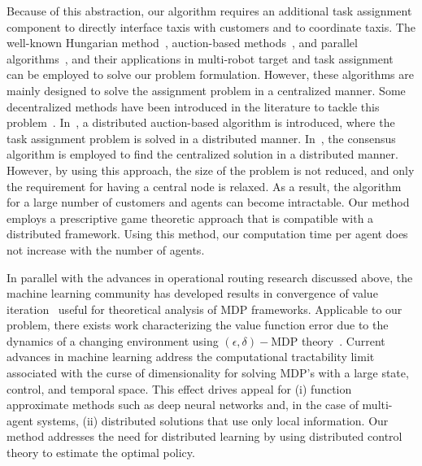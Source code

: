 \documentclass[journal]{IEEEtran}
\begin{document}
Because of this abstraction, our algorithm requires an additional task assignment component to directly interface taxis with customers and to coordinate taxis. The well-known Hungarian method~\cite{kuhn, Edmonds,yu2014target}, auction-based methods~\cite{Bertsekas1988}, and parallel algorithms~\cite{Bertsekas}, and their applications in multi-robot target and task assignment~\cite{Schumacher,Jin,Bellingham} can be employed to solve our problem formulation. However, these algorithms are mainly designed to solve the assignment problem in a centralized manner. Some decentralized methods have been introduced in the literature to tackle this problem~\cite{morgan2016swarm,Dionnedec, sujitdec, How2009}. In~\cite{morgan2016swarm}, a distributed auction-based algorithm is introduced, where the task assignment problem is solved in a distributed manner. In~\cite{How2009}, the consensus algorithm is employed to find the centralized solution in a distributed manner. However, by using this approach, the size of the problem is not reduced, and only the requirement for having a central node is relaxed. As a result, the algorithm for a large number of customers and agents can become intractable. Our method employs a prescriptive game theoretic approach that is compatible with a distributed framework. Using this method, our computation time per agent does not increase with the number of agents. 

In parallel with the advances in operational routing research discussed above, the machine learning community has developed results in convergence of value iteration~\cite{littman_csaba_1998,changing,Csaba_littman_1999} useful for theoretical analysis of MDP frameworks. Applicable to our problem, there exists work characterizing the value function error due to the dynamics of a changing environment using $(\epsilon,\delta)-\mathrm{MDP}$ theory~\cite{changing}. Current advances in machine learning address the computational tractability limit associated with the curse of dimensionality for solving MDP's with a large state, control, and temporal space. This effect drives appeal for (i) function approximate methods such as deep neural networks and, in the case of multi-agent systems, (ii) distributed solutions that use only local information. Our method addresses the need for distributed learning by using distributed control theory to estimate the optimal policy. 

\end{document}

